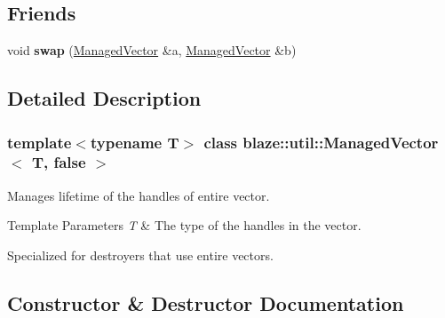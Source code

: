 \subsection*{Friends}
\begin{DoxyCompactItemize}
\item 
\mbox{\label{classblaze_1_1util_1_1ManagedVector_3_01T_00_01false_01_4_a2356c6e19e1abf8baa8245af129607b8}} 
void {\bfseries swap} (\hyperlink{classblaze_1_1util_1_1ManagedVector}{Managed\+Vector} \&a, \hyperlink{classblaze_1_1util_1_1ManagedVector}{Managed\+Vector} \&b)
\end{DoxyCompactItemize}


\subsection{Detailed Description}
\subsubsection*{template$<$typename T$>$\newline
class blaze\+::util\+::\+Managed\+Vector$<$ T, false $>$}

Manages lifetime of the handles of entire vector. 


\begin{DoxyTemplParams}{Template Parameters}
{\em T} & The type of the handles in the vector.\\
\hline
\end{DoxyTemplParams}
Specialized for destroyers that use entire vectors. 

\subsection{Constructor \& Destructor Documentation}
\mbox{\label{classblaze_1_1util_1_1ManagedVector_3_01T_00_01false_01_4_abaf98d296e4f9f2c1cc2a4fb819def5b}} 
